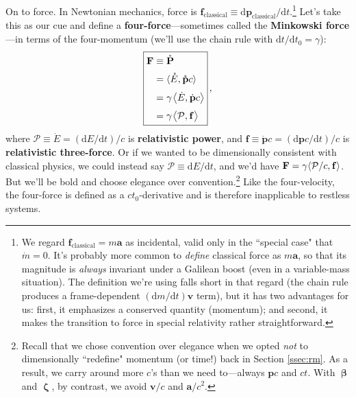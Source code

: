 \documentclass[12pt]{article}
\renewcommand{\vv}[1]{\mathbf{#1}}
\newcommand{\dd}[1]{\mathrm{d}#1}
\newcommand{\vvbeta}{\bm{\upbeta}}
\newcommand{\vvzeta}{\bm{\upzeta}}
\begin{document}
On to force. In Newtonian mechanics, force is $\vv f_{\mathrm{classical}} \equiv \dd \vv p_{\mathrm{classical}} / \dd t$.\footnote{\label{fn:cf}We regard $\vv f_{\mathrm{classical}} = m \vv a$ as incidental, valid only in the ``special case" that $\dot{m} = 0$. It's probably more common to \emph{define} classical force as $m \vv a$, so that its magnitude is \emph{always} invariant under a Galilean boost (even in a variable-mass situation). The definition we're using falls short in that regard (the chain rule produces a frame-dependent $(\dd m / \dd t) \vv v$ term), but it has two advantages for us: first, it emphasizes a conserved quantity (momentum); and second, it makes the transition to force in special relativity rather straightforward.} Let's take this as our cue and define a \textbf{four-force}---sometimes called the \textbf{Minkowski force}---in terms of the four-momentum (we'll use the chain rule with $\dd t / \dd t_0 = \gamma$):
\begin{equation}\label{eq:33}
\boxed{
\begin{aligned}
\vv F &\equiv \mathring{\vv P} \\[2pt]
&= \langle \mathring{E}, \mkern.5mu \mathring{\vv p} c \rangle \\[3pt]
&= \gamma \mkern1.5mu \big \langle \dot{E}, \mkern.5mu \dot{\vv p} c \big \rangle \\[3pt]
&=\gamma \mkern1.5mu \big \langle \mathcal{P}, \mkern.5mu \vv f \big \rangle
\end{aligned}
} \, ,
\end{equation}
where $\mathcal{P} \equiv \dot{E} = (\dd E / \dd t)/c$ is \textbf{relativistic power}, and $\vv f \equiv \dot{\vv p} c = (\dd \vv p c / \dd t)/c$ is \textbf{relativistic three-force}. Or if we wanted to be dimensionally consistent with classical physics, we could instead say $\mathcal{P} \equiv \dd E / \dd t$, and we'd have $\vv F = \gamma \langle \mathcal{P}/c, \mkern.5mu \vv f \rangle$. But we'll be bold and choose elegance over convention.\footnote{Recall that we chose convention over elegance when we opted \emph{not} to dimensionally ``redefine" momentum (or time!) back in Section \ref{ssec:rm}. As a result, we carry around more $c$'s than we need to---always $\vv p c$ and $ct$. With $\vvbeta$ and $\vvzeta$, by contrast, we avoid $\vv v / c$ and $\vv a / c^2$.} Like the four-velocity, the four-force is defined as a $ct_0$-derivative and is therefore inapplicable to restless systems.
\end{document}

